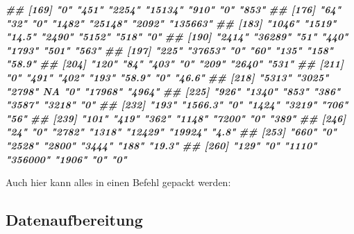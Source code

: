 \documentclass[11pt,german,a4paper]{article}
\newenvironment{Shaded}{\begin{snugshade}}{\end{snugshade}}
\newcommand{\DocumentationTok}[1]{\textcolor[rgb]{0.56,0.35,0.01}{\textbf{\textit{#1}}}}
\newcommand{\FunctionTok}[1]{\textcolor[rgb]{0.00,0.00,0.00}{#1}}
\newcommand{\NormalTok}[1]{#1}
\newcommand{\OtherTok}[1]{\textcolor[rgb]{0.56,0.35,0.01}{#1}}
\newcommand{\SpecialCharTok}[1]{\textcolor[rgb]{0.00,0.00,0.00}{#1}}
\newcommand{\StringTok}[1]{\textcolor[rgb]{0.31,0.60,0.02}{#1}}
\begin{document}
\begin{Shaded}
\begin{Highlighting}[]
\DocumentationTok{\#\# [169] "0"       "451"     "2254"    "15134"   "910"     "0"       "853"    }
\DocumentationTok{\#\# [176] "64"      "32"      "0"       "1482"    "25148"   "2092"    "135663" }
\DocumentationTok{\#\# [183] "1046"    "1519"    "14.5"    "2490"    "5152"    "518"     "0"      }
\DocumentationTok{\#\# [190] "2414"    "36289"   "51"      "440"     "1793"    "501"     "563"    }
\DocumentationTok{\#\# [197] "225"     "37653"   "0"       "60"      "135"     "158"     "58.9"   }
\DocumentationTok{\#\# [204] "120"     "84"      "403"     "0"       "209"     "2640"    "531"    }
\DocumentationTok{\#\# [211] "0"       "491"     "402"     "193"     "58.9"    "0"       "46.6"   }
\DocumentationTok{\#\# [218] "5313"    "3025"    "2798"    NA        "0"       "17968"   "4964"   }
\DocumentationTok{\#\# [225] "926"     "1340"    "853"     "386"     "3587"    "3218"    "0"      }
\DocumentationTok{\#\# [232] "193"     "1566.3"  "0"       "1424"    "3219"    "706"     "56"     }
\DocumentationTok{\#\# [239] "101"     "419"     "362"     "1148"    "7200"    "0"       "389"    }
\DocumentationTok{\#\# [246] "24"      "0"       "2782"    "1318"    "12429"   "19924"   "4.8"    }
\DocumentationTok{\#\# [253] "660"     "0"       "2528"    "2800"    "3444"    "188"     "19.3"   }
\DocumentationTok{\#\# [260] "129"     "0"       "1110"    "356000"  "1906"    "0"       "0"}
\end{Highlighting}
\end{Shaded}

Auch hier kann alles in einen Befehl gepackt werden:

\begin{Shaded}
\end{Shaded}

\hypertarget{datenaufbereitung}{%
\subsection{Datenaufbereitung}\label{datenaufbereitung}}
\end{document}
